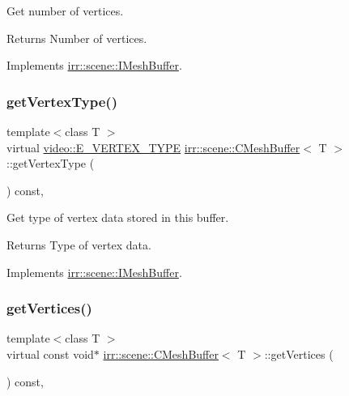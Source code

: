 Get number of vertices. 

\begin{DoxyReturn}{Returns}
Number of vertices. 
\end{DoxyReturn}


Implements \hyperlink{classirr_1_1scene_1_1IMeshBuffer_a77ab285c8c886af8ddeb0371db7bde96}{irr\+::scene\+::\+I\+Mesh\+Buffer}.

\mbox{\label{classirr_1_1scene_1_1CMeshBuffer_a341db661218a49d8d8fd12550700cb67}} 
\subsubsection{\texorpdfstring{get\+Vertex\+Type()}{getVertexType()}}
{\footnotesize\ttfamily template$<$class T $>$ \\
virtual \hyperlink{namespaceirr_1_1video_a0e3b59e025e0d0db0ed2ee0ce904deac}{video\+::\+E\+\_\+\+V\+E\+R\+T\+E\+X\+\_\+\+T\+Y\+PE} \hyperlink{classirr_1_1scene_1_1CMeshBuffer}{irr\+::scene\+::\+C\+Mesh\+Buffer}$<$ T $>$\+::get\+Vertex\+Type (\begin{DoxyParamCaption}{ }\end{DoxyParamCaption}) const\hspace{0.3cm}{\ttfamily [inline]}, {\ttfamily [virtual]}}



Get type of vertex data stored in this buffer. 

\begin{DoxyReturn}{Returns}
Type of vertex data. 
\end{DoxyReturn}


Implements \hyperlink{classirr_1_1scene_1_1IMeshBuffer_a4d7a84ae4416487736f0ed0f519bb4f0}{irr\+::scene\+::\+I\+Mesh\+Buffer}.

\mbox{\label{classirr_1_1scene_1_1CMeshBuffer_ad9463b97ee94bbc26bbb11bf867ea830}} 
\subsubsection{\texorpdfstring{get\+Vertices()}{getVertices()}\hspace{0.1cm}{\footnotesize\ttfamily [1/2]}}
{\footnotesize\ttfamily template$<$class T $>$ \\
virtual const void$\ast$ \hyperlink{classirr_1_1scene_1_1CMeshBuffer}{irr\+::scene\+::\+C\+Mesh\+Buffer}$<$ T $>$\+::get\+Vertices (\begin{DoxyParamCaption}{ }\end{DoxyParamCaption}) const\hspace{0.3cm}{\ttfamily [inline]}, {\ttfamily [virtual]}}



